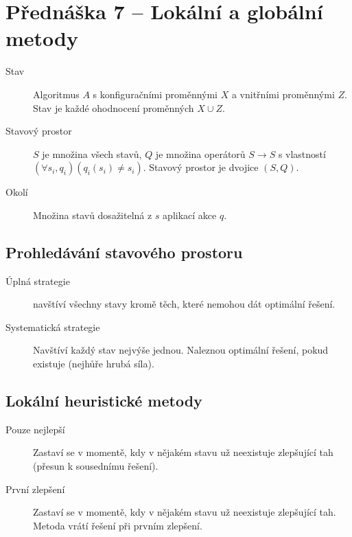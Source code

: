 \section{Přednáška 7 -- Lokální a globální metody}

\begin{description}
    \item[Stav] Algoritmus $A$ s konfiguračními proměnnými $X$ a vnitřními proměnnými $Z$.
    Stav je každé ohodnocení proměnných $X \cup Z$.
    \item[Stavový prostor] $S$ je množina všech stavů, $Q$ je množina operátorů $S \to S$ s vlastností $(\forall s_i, q_i) (q_i(s_i) \neq s_i)$.
    Stavový prostor je dvojice $(S,Q)$.
    \item[Okolí] Množina stavů dosažitelná z $s$ aplikací akce $q$.
\end{description}

\subsection{Prohledávání stavového prostoru}

\begin{description}
    \item[Úplná strategie] navštíví všechny stavy kromě těch, které nemohou dát optimální řešení.
    \item[Systematická strategie] Navštíví každý stav nejvýše jednou.
    Naleznou optimální řešení, pokud existuje (nejhůře hrubá síla).
\end{description}

\subsection{Lokální heuristické metody}

\begin{description}
    \item[Pouze nejlepší] Zastaví se v momentě, kdy v nějakém stavu už neexistuje zlepšující tah (přesun k sousednímu řešení).
    \item[První zlepšení] Zastaví se v momentě, kdy v nějakém stavu už neexistuje zlepšující tah.
    Metoda vrátí řešení při prvním zlepšení.
\end{description}

